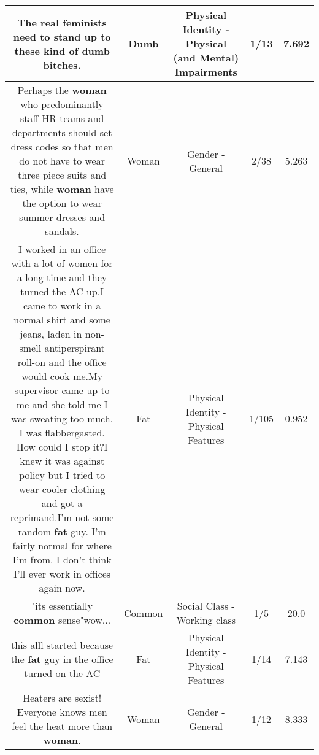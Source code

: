 \documentclass[11pt]{article}
\newlength\mylength
\begin{document}
\begin{center}
\begin{longtable}{|C{.65\mylength}|C{.30\mylength}|C{.12\mylength}|C{.12\mylength}|C{.12\mylength}|}
  \small The real feminists need to stand up to these kind of \textbf{dumb} bitches.\normalsize   & Dumb & Physical Identity - Physical (and Mental) Impairments & 1/13 & 7.692 \\  \hline
  \small Perhaps the \textbf{woman} who predominantly staff HR teams and departments should set dress codes so that men do not have to wear three piece suits and ties, while \textbf{woman} have the option to wear summer dresses and sandals.\normalsize   & Woman & Gender - General & 2/38 & 5.263 \\  \hline
  \small I worked in an office with a lot of women for a long time and they turned the AC up.I came to work in a normal shirt and some jeans, laden in non-smell antiperspirant roll-on and the office would cook me.My supervisor came up to me and she told me I was sweating too much. I was flabbergasted. How could I stop it?I knew it was against policy but I tried to wear cooler clothing and got a reprimand.I'm not some random \textbf{fat} guy. I'm fairly normal for where I'm from. I don't think I'll ever work in offices again now.\normalsize   & Fat & Physical Identity - Physical Features & 1/105 & 0.952 \\  \hline
  \small "its essentially \textbf{common} sense"wow...\normalsize   & Common & Social Class - Working class & 1/5 & 20.0 \\  \hline
  \small this alll started because the \textbf{fat} guy in the office turned on the AC\normalsize   & Fat & Physical Identity - Physical Features & 1/14 & 7.143 \\  \hline
  \small Heaters are sexist! Everyone knows men feel the heat more than \textbf{woman}.\normalsize   & Woman & Gender - General & 1/12 & 8.333 \\  \hline

\end{longtable}
\end{center}
\end{document}
